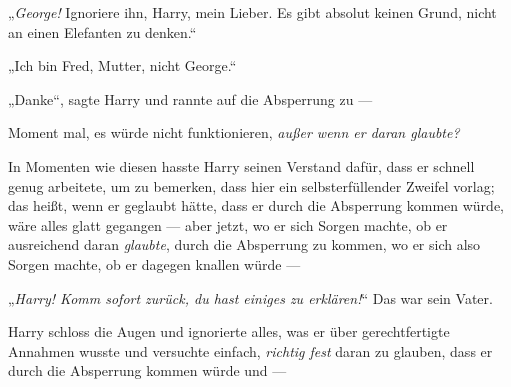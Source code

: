 „\emph{George!} Ignoriere ihn, Harry, mein Lieber. Es gibt absolut keinen Grund, nicht an einen Elefanten zu denken.“

„Ich bin Fred, Mutter, nicht George.“

„Danke“, sagte Harry und rannte auf die Absperrung zu —

Moment mal, es würde nicht funktionieren, \emph{außer wenn er daran glaubte?}

In Momenten wie diesen hasste Harry seinen Verstand dafür, dass er schnell genug arbeitete, um zu bemerken, dass hier ein selbsterfüllender Zweifel vorlag; das heißt, wenn er geglaubt hätte, dass er durch die Absperrung kommen würde, wäre alles glatt gegangen — aber jetzt, wo er sich Sorgen machte, ob er ausreichend daran \emph{glaubte}, durch die Absperrung zu kommen, wo er sich also Sorgen machte, ob er dagegen knallen würde — %

„\emph{Harry! Komm sofort zurück, du hast einiges zu erklären!}“ Das war sein Vater.

Harry schloss die Augen und ignorierte alles, was er über gerechtfertigte Annahmen wusste und versuchte einfach, \emph{richtig fest} daran zu glauben, dass er durch die Absperrung kommen würde und —

